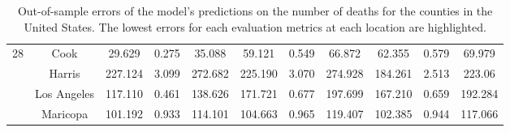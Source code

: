 \begin{landscape}
\begin{table}[!htb]
\begin{tabular}{| c | c | c | c | c | c | c | c | c | c | c |}
        \multirow{4}{*}{28}
            & Cook & 29.629 & 0.275 & 35.088 & 59.121 & 0.549 & 66.872 & 62.355 & 0.579 & 69.979
            \\ \cline{2-11}
            & Harris & 227.124 & 3.099 & 272.682 & 225.190 & 3.070 & 274.928 & 184.261 & 2.513 & 223.06
            \\ \cline{2-11}
            & Los Angeles & 117.110 & 0.461 & 138.626 & 171.721 & 0.677 & 197.699 & 167.210 & 0.659 & 192.284
            \\ \cline{2-11}
            & Maricopa & 101.192 & 0.933 & 114.101 & 104.663 & 0.965 & 119.407 & 102.385 & 0.944 & 117.066
            \\
        \hline
    \end{tabular}
    \caption{Out-of-sample errors of the model's predictions on the number of deaths for the counties in the United States. The lowest errors for each evaluation metrics at each location are highlighted.}
\end{table}
\end{landscape}

